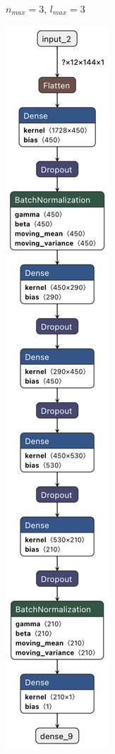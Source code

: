 \begin{figure}
\begin{subfigure}[t]{.155\textwidth}
    \caption{$n_{max}=3$, $l_{max}=3$}
  \end{subfigure}
  \hfill
  \begin{subfigure}[t]{.155\textwidth}
    \centering
    \includegraphics[width=\linewidth]{figures/regression/model_9-3.png}  

\end{subfigure}
\end{figure}
